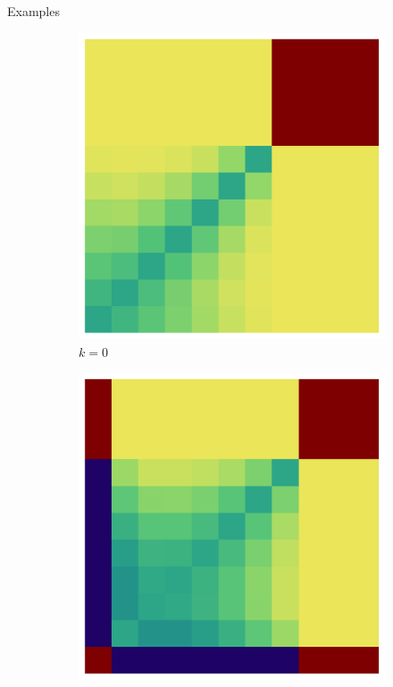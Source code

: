 \documentclass{beamer}
\theoremstyle{definition}
\begin{document}
\begin{frame}[shrink=10]{Examples}
    \begin{figure}[H]
    \centering
    \begin{subfigure}[b]{0.185\textwidth}
        \includegraphics[width=\textwidth]{img/ppkB_Plot_4_0_10.png}
        \caption{$k=0$}
        \label{fig:ppkBG_4_0}
    \end{subfigure}
    \hspace{0.00\textwidth} %
    \begin{subfigure}[b]{0.185\textwidth}
        \includegraphics[width=\textwidth]{img/ppkB_Plot_4_1_10.png}

\end{subfigure}
\end{figure}
\end{frame}
\end{document}
